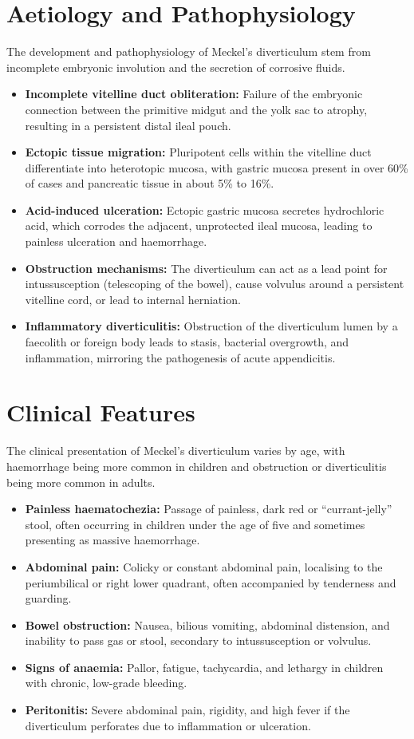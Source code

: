 \section*{Aetiology and Pathophysiology}
The development and pathophysiology of Meckel's diverticulum stem from incomplete embryonic involution and the secretion of corrosive fluids.
\begin{itemize}
    \item \textbf{Incomplete vitelline duct obliteration:} Failure of the embryonic connection between the primitive midgut and the yolk sac to atrophy, resulting in a persistent distal ileal pouch.
    \item \textbf{Ectopic tissue migration:} Pluripotent cells within the vitelline duct differentiate into heterotopic mucosa, with gastric mucosa present in over 60\% of cases and pancreatic tissue in about 5\% to 16\%.
    \item \textbf{Acid-induced ulceration:} Ectopic gastric mucosa secretes hydrochloric acid, which corrodes the adjacent, unprotected ileal mucosa, leading to painless ulceration and haemorrhage.
    \item \textbf{Obstruction mechanisms:} The diverticulum can act as a lead point for intussusception (telescoping of the bowel), cause volvulus around a persistent vitelline cord, or lead to internal herniation.
    \item \textbf{Inflammatory diverticulitis:} Obstruction of the diverticulum lumen by a faecolith or foreign body leads to stasis, bacterial overgrowth, and inflammation, mirroring the pathogenesis of acute appendicitis.
\end{itemize}

\section*{Clinical Features}
The clinical presentation of Meckel's diverticulum varies by age, with haemorrhage being more common in children and obstruction or diverticulitis being more common in adults.
\begin{itemize}
    \item \textbf{Painless haematochezia:} Passage of painless, dark red or ``currant-jelly'' stool, often occurring in children under the age of five and sometimes presenting as massive haemorrhage.
    \item \textbf{Abdominal pain:} Colicky or constant abdominal pain, localising to the periumbilical or right lower quadrant, often accompanied by tenderness and guarding.
    \item \textbf{Bowel obstruction:} Nausea, bilious vomiting, abdominal distension, and inability to pass gas or stool, secondary to intussusception or volvulus.
    \item \textbf{Signs of anaemia:} Pallor, fatigue, tachycardia, and lethargy in children with chronic, low-grade bleeding.
    \item \textbf{Peritonitis:} Severe abdominal pain, rigidity, and high fever if the diverticulum perforates due to inflammation or ulceration.
\end{itemize}

